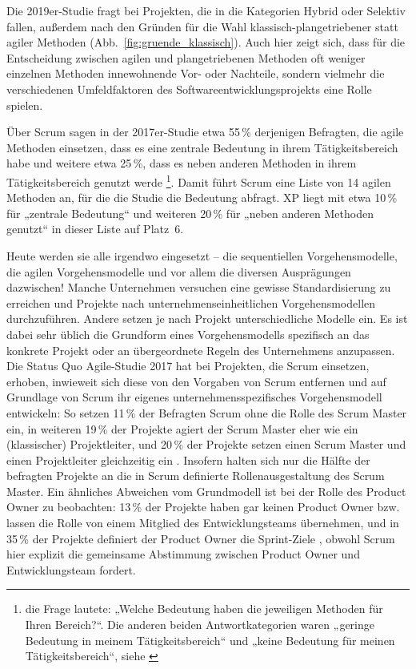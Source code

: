 \pagebreak %

Die 2019er-Studie fragt bei Projekten, die in die Kategorien Hybrid oder Selektiv fallen, außerdem nach den Gründen für die Wahl klassisch-plangetriebener statt agiler Methoden (Abb.~\ref{fig:gruende_klassisch}). Auch hier zeigt sich, dass für die Entscheidung zwischen agilen und plangetriebenen Methoden oft weniger einzelnen Methoden innewohnende Vor- oder Nachteile, sondern vielmehr die verschiedenen Umfeldfaktoren des Softwareentwicklungsprojekts eine Rolle spielen. 


Über Scrum sagen in der 2017er-Studie etwa 55\,\% derjenigen Befragten, die agile Methoden einsetzen, dass es eine zentrale Bedeutung in ihrem Tätigkeitsbereich habe und weitere etwa 25\,\%, dass es neben anderen Methoden in ihrem Tätigkeitsbereich genutzt werde \cite[50]{kom17}\footnote{die Frage lautete: „Welche Bedeutung haben die jeweiligen Methoden für Ihren Bereich?“. Die anderen beiden Antwortkategorien waren „geringe Bedeutung in meinem Tätigkeitsbereich“ und „keine Bedeutung für meinen Tätigkeitsbereich“, siehe \cite[50]{kom17}}. Damit führt Scrum eine Liste von 14 agilen Methoden an, für die die Studie die Bedeutung abfragt. XP liegt mit etwa 10\,\% für „zentrale Bedeutung“ und weiteren 20\,\% für „neben anderen Methoden genutzt“ in dieser Liste auf Platz~6.

Heute werden sie alle irgendwo eingesetzt – die sequentiellen Vorgehensmodelle, die agilen Vorgehensmodelle und vor allem die diversen Ausprägungen dazwischen! Manche Unternehmen versuchen eine gewisse Standardisierung zu erreichen und Projekte nach unternehmenseinheitlichen Vorgehensmodellen durchzuführen. Andere setzen je nach Projekt unterschiedliche Modelle ein. Es ist dabei sehr üblich die Grundform eines Vorgehensmodells spezifisch an das konkrete Projekt oder an übergeordnete Regeln des Unternehmens anzupassen. Die Status Quo Agile-Studie 2017 hat bei Projekten, die Scrum einsetzen, erhoben, inwieweit sich diese von den Vorgaben von Scrum entfernen und auf Grundlage von Scrum ihr eigenes unternehmens\-spezifisches Vorgehensmodell entwickeln: So setzen 11\,\% der Befragten Scrum ohne die Rolle des Scrum Master ein, in weiteren 19\,\% der Projekte agiert der Scrum Master eher wie ein (klassischer) Projektleiter, und 20\,\% der Projekte setzen einen Scrum Master und einen Projektleiter gleichzeitig ein \cite[99]{kom17}. Insofern halten sich nur die Hälfte der befragten Projekte an die in Scrum definierte Rollenausgestaltung des Scrum Master. Ein ähnliches Abweichen vom Grundmodell ist bei der Rolle des Product Owner zu beobachten: 13\,\% der Projekte haben gar keinen Product Owner bzw. lassen die Rolle von einem Mitglied des Entwicklungsteams übernehmen, und in 35\,\% der Projekte definiert der Product Owner die Sprint-Ziele \cite[100]{kom17}, obwohl Scrum hier explizit die gemeinsame Abstimmung zwischen Product Owner und Entwicklungsteam fordert.

